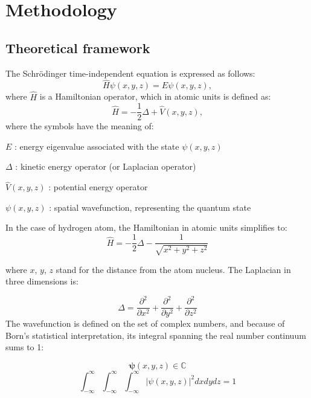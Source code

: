 \section{Methodology}

\subsection{Theoretical framework}

The Schrödinger time-independent equation is expressed as follows:
\begin{equation}
	\hat{H} \psi(x,y,z) = E \psi(x,y,z),
\end{equation}
where \(\hat{H}\) is a Hamiltonian operator, which in atomic units is defined as:
\begin{equation}
	\hat{H} = -\frac{1}{2} \Delta + \hat{V}(x,y,z),
\end{equation}
where the symbols have the meaning of:

\(E\) : energy eigenvalue associated with the state \(\psi(x,y,z)\)

\(\Delta\) : kinetic energy operator (or Laplacian operator)

\(\hat{V}(x,y,z)\) : potential energy operator

\(\psi(x,y,z)\) : spatial wavefunction, representing the quantum state

\noindent In the case of hydrogen atom, the Hamiltonian in atomic units simplifies to:
\begin{equation}
	\hat{H} = -\frac{1}{2}\Delta-\frac{1}{\sqrt{x^2+y^2+z^2}}
\end{equation}

where $x$, $y$, $z$ stand for the distance from the atom nucleus. The Laplacian in three dimensions is:

\begin{equation}
	\Delta = \frac{\partial^2}{\partial x^2} + \frac{\partial^2}{\partial y^2} + \frac{\partial^2}{\partial z^2}
\end{equation}
The wavefunction is defined on the set of complex numbers, and because of Born's statistical interpretation, its integral spanning the real number continuum sums to 1:

\begin{equation}
	\boldsymbol{\psi}(x,y,z) \in \mathbb{C}
\end{equation}
\begin{equation}
	\int_{-\infty}^\infty\int_{-\infty}^{\infty}\int_{-\infty}^{\infty}\lvert \psi(x,y,z) \rvert^2 dx dy dz = 1
\end{equation}

